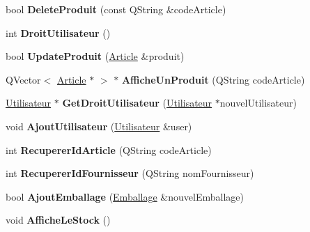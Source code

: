 \begin{DoxyCompactItemize}
\item 
\mbox{\label{class_database_a97706987772bccee67a642049e6d4346}} 
bool {\bfseries Delete\+Produit} (const Q\+String \&code\+Article)
\item 
\mbox{\label{class_database_aed063d82ea503f8c7c30e706b39bea89}} 
int {\bfseries Droit\+Utilisateur} ()
\item 
\mbox{\label{class_database_a6bfd362538a58b4c35ab538ed89a18eb}} 
bool {\bfseries Update\+Produit} (\mbox{\hyperlink{class_article}{Article}} \&produit)
\item 
\mbox{\label{class_database_ae32742b9f3650989269b1a7fab39a349}} 
Q\+Vector$<$ \mbox{\hyperlink{class_article}{Article}} $\ast$ $>$ $\ast$ {\bfseries Affiche\+Un\+Produit} (Q\+String code\+Article)
\item 
\mbox{\label{class_database_a11db260d702850148645c86c12da3a82}} 
\mbox{\hyperlink{class_utilisateur}{Utilisateur}} $\ast$ {\bfseries Get\+Droit\+Utilisateur} (\mbox{\hyperlink{class_utilisateur}{Utilisateur}} $\ast$nouvel\+Utilisateur)
\item 
\mbox{\label{class_database_ac9215994d89323fa31b0abdb98ab5463}} 
void {\bfseries Ajout\+Utilisateur} (\mbox{\hyperlink{class_utilisateur}{Utilisateur}} \&user)
\item 
\mbox{\label{class_database_a1f5de294783ac0aec3d44fd6faf4fd7c}} 
int {\bfseries Recuperer\+Id\+Article} (Q\+String code\+Article)
\item 
\mbox{\label{class_database_a56ab74f41841b337e2e19e790d524542}} 
int {\bfseries Recuperer\+Id\+Fournisseur} (Q\+String nom\+Fournisseur)
\item 
\mbox{\label{class_database_af3a1bf9584c2f39021148f948c1d6bb2}} 
bool {\bfseries Ajout\+Emballage} (\mbox{\hyperlink{class_emballage}{Emballage}} \&nouvel\+Emballage)
\item 
\mbox{\label{class_database_a284a9b6a05cfc9501e4a9f720d09ada8}} 
void {\bfseries Affiche\+Le\+Stock} ()

\end{DoxyCompactItemize}
